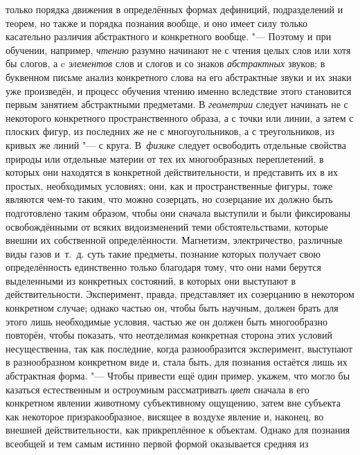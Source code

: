 только порядка движения в определённых формах дефиниций, подразделений и
теорем, но также и порядка познания вообще, и оно имеет силу только
касательно различия абстрактного и конкретного
вообще.
"--- Поэтому и при обучении, например,
{\em чтению} разумно
начинают не с чтения целых слов или хотя бы слогов, а c
{\em элементов} слов и
слогов и со знаков {\em абстрактных}
звуков; в буквенном письме анализ конкретного слова на его
абстрактные звуки и их знаки уже произведён, и процесс обучения чтению
именно вследствие этого становится первым занятием абстрактными предметами.
В {\em геометрии} следует
начинать не с некоторого конкретного пространственного образа, а с точки
или линии, а затем с плоских фигур, из последних же не с многоугольников, а
с треугольников, из кривых же линий "--- с круга. В~{\em физике} следует
освободить отдельные свойства природы или отдельные материи от тех их
многообразных переплетений, в которых они находятся в конкретной
действительности, и представить их в их простых, необходимых условиях; они,
как и пространственные фигуры, тоже являются чем-то таким, что можно
созерцать, но созерцание их должно быть подготовлено таким образом, чтобы
они сначала выступили и были фиксированы освобождёнными от всяких
видоизменений теми обстоятельствами, которые внешни их
собственной определённости. Магнетизм, электричество, различные виды газов
и~т.~д. суть такие предметы, познание которых получает свою определённость
единственно только благодаря тому, что они нами берутся выделенными из
конкретных состояний, в которых они выступают в действительности.
Эксперимент, правда, представляет их созерцанию в некотором конкретном
случае; однако частью он, чтобы быть научным, должен брать для этого лишь
необходимые условия, частью же он должен быть многообразно повторён, чтобы
показать, что неотделимая конкретная сторона этих условий несущественна,
так как последние, когда разнообразится эксперимент, выступают в
разнообразном конкретном виде и, стала быть, для познания остаётся лишь их
абстрактная форма. "--- Чтобы привести ещё один пример, укажем,
что могло бы казаться естественным и остроумным рассматривать
{\em цвет} сначала в его
конкретном явлении животному субъективному ощущению, затем вне субъекта как
некоторое призракообразное, висящее в воздухе явление и, наконец, во
внешней действительности, как прикреплённое к объектам. Однако для познания
всеобщей и тем самым истинно первой формой оказывается средняя из
